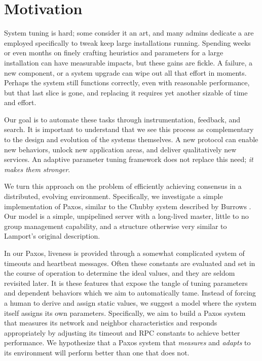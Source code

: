 
\section{Motivation}
System tuning is hard; some consider it an art, and many admins dedicate a are employed specifically to tweak keep large installations running.
Spending weeks or even months on finely crafting heuristics and parameters for a large installation can have measurable impacts, but these gains are fickle.
A failure, a new component, or a system upgrade can wipe out all that effort in moments.
Perhaps the system still functions correctly, even with reasonable performance, but that last slice is gone, and replacing it requires yet another sizable of time and effort.

Our goal is to automate these tasks through instrumentation, feedback, and search.
It is important to understand that we see this process as complementary to the design and evolution of the systems themselves.
A new protocol can enable new behaviors, unlock new application areas, and deliver qualitatively new services.
An adaptive parameter tuning framework does not replace this need; \emph{it makes them stronger}.

We turn this approach on the problem of efficiently achieving consensus in a distributed, evolving environment.
Specifically, we investigate a simple implementation of Paxos, similar to the Chubby system described by Burrows \cite{burrows2006chubby}.
Our model is a simple, unpipelined server with a long-lived master, little to no group management capability, and a structure otherwise very similar to Lamport's original description.

In our Paxos, liveness is provided through a somewhat complicated system of timeouts and heartbeat messages.
Often these constants are evaluated and set in the course of operation to determine the ideal values, and they are seldom revisited later.
It is these features that expose the tangle of tuning parameters and dependent behaviors which we aim to automatically tame.
Instead of forcing a human to derive and assign static values, we suggest a model where the system itself assigns its own parameters.
Specifically, we aim to build a Paxos system that measures its network and neighbor characteristics and responds appropriately by adjusting its timeout and RPC constants to achieve better performance.
We hypothesize that a Paxos system that \emph{measures} and \emph{adapts} to its environment will perform better than one that does not.


